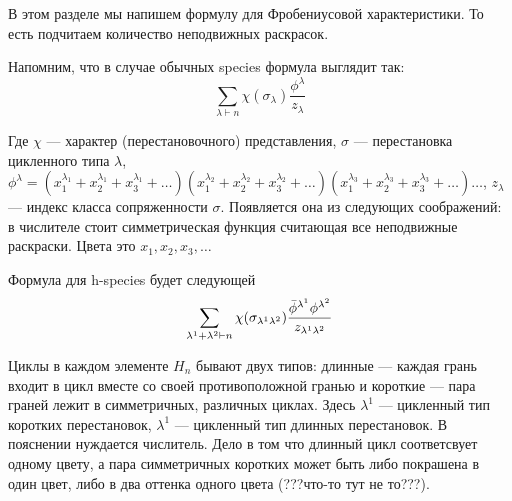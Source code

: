 В этом разделе мы напишем формулу для Фробениусовой характеристики.
То есть подчитаем количество неподвижных раскрасок.

Напомним, что в случае обычных species формула выглядит так:
\begin{equation}
\label{eq:fr}
\sum_{\lambda \vdash n}\chi(\sigma_{\lambda}) \frac{\phi^{\lambda}}{z_{\lambda}}
\end{equation}

Где $\chi$ --- характер (перестановочного) представления, $\sigma$ ---
перестановка цикленного типа $\lambda$, 
$\phi^{\lambda} = 
(x_1^{\lambda_1} + x_2^{\lambda_1} + x_3^{\lambda_1} + \dots)
(x_1^{\lambda_2} + x_2^{\lambda_2} + x_3^{\lambda_2} + \dots)
(x_1^{\lambda_3} + x_2^{\lambda_3} + x_3^{\lambda_3} + \dots)
\dots$,
 $z_\lambda$ --- индекс класса сопряженности $\sigma$.
Появляется она из следующих соображений: в числителе стоит симметрическая
функция считающая все неподвижные раскраски. Цвета это $x_1, x_2, x_3, \dots$

Формула для h-species будет следующей
\begin{equation}
\label{eq:h-fr}
\sum_{\lambda^1 + \lambda^2 \vdash n}\chi(\sigma_{\lambda^1 \lambda^2})
\frac{\Bar{\phi}^{\lambda^1} \phi^{\lambda^2}}{z_{\lambda^1 \lambda^2}}
\end{equation}

Циклы в каждом элементе $H_n$ бывают двух типов:
длинные --- каждая грань входит в цикл вместе со своей противоположной гранью и
короткие --- пара граней лежит в симметричных, различных циклах. Здесь
$\lambda^1$ --- цикленный тип коротких перестановок, $\lambda^1$ --- цикленный тип длинных перестановок.
В пояснении нуждается числитель. Дело в том что длинный цикл соответсвует
одному цвету, а пара симметричных коротких может быть либо покрашена в один
цвет, либо в два оттенка одного цвета (???что-то тут не то???).
